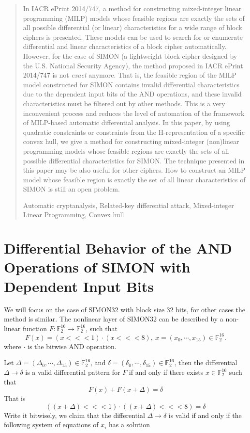 \documentclass[runningheads]{llncs}
\newcommand{\keywords}[1]{\par\addvspace\baselineskip
\noindent\keywordname\enspace\ignorespaces#1}
\begin{document}
\begin{abstract}
In IACR ePrint 2014/747, a method for constructing mixed-integer linear programming (MILP) models whose feasible regions are exactly the sets of all possible differential (or linear) characteristics for a wide range of block ciphers is presented. These models can be used to search for or enumerate differential and linear characteristics of a block cipher automatically. However, for the case of SIMON (a lightweight block cipher designed by the U.S. National Security Agency), the method proposed in IACR ePrint 2014/747 is not {\it exact} anymore. That is, the feasible region of the MILP model constructed for SIMON contains invalid differential characteristics due to the dependent input bits of the AND operations, and these invalid characteristics must be filtered out by other methods. This is a very inconvenient process and reduces the level of automation of the framework of MILP-based automatic differential analysis. In this paper, by using quadratic constraints or constraints from the H-representation of a specific convex hull, we give a method for constructing mixed-integer (non)linear programming models whose feasible regions are exactly the sets of all possible differential characteristics for SIMON. The technique presented in this paper may be also useful for other ciphers. How to construct an MILP model whose feasible region is exactly the set of all linear characteristics of SIMON is still an open problem.



\keywords{Automatic cryptanalysis, Related-key differential attack, Mixed-integer Linear Programming, Convex hull}
\end{abstract}


\section{Differential Behavior of the AND Operations of SIMON with Dependent Input Bits }
We will focus on the case of SIMON32 \cite{simon_spec} with block size 32 bits, for other cases the method is similar. The nonlinear layer of SIMON32 can be described by a non-linear function $F:\mathbb{F}_2^{16} \rightarrow \mathbb{F}_2^{16} $, such that
$$F(x) = (x<<<1) \cdot (x<<<8), ~x = (x_0, \cdots, x_{15}) \in \mathbb{F}_2^{16}. $$
where $\cdot$ is the bitwise AND operation.


Let $\Delta = (\Delta_0, \cdots, \Delta_{15}) \in \mathbb{F}_2^{16}$, and $\delta = (\delta_0, \cdots, \delta_{15}) \in \mathbb{F}_2^{16}$, then the differential $\Delta \rightarrow \delta$ is a valid differential pattern for $F$ if and only if 
there exists $x \in \mathbb{F}_2^{16}$ such that
$$F(x) + F(x + \Delta)  =  \delta$$
That is
$$ ((x + \Delta)<<<1) \cdot ((x + \Delta)<<<8) = \delta$$
Write it bitwisely, we claim that the differential $\Delta \rightarrow \delta$ is valid if and only if the following system of equations of $x_i$ has a solution
\end{document}
